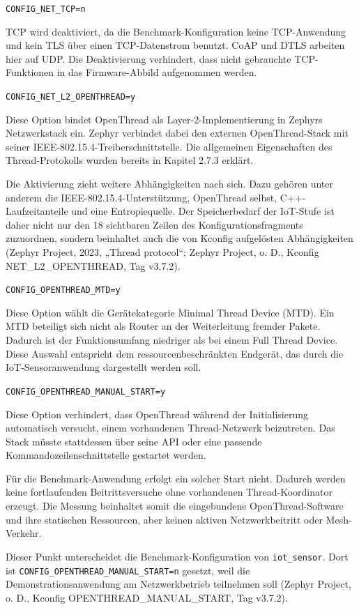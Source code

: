 \lstinline[style=fileinline]|CONFIG_NET_TCP=n|

TCP wird deaktiviert, da die Benchmark-Konfiguration keine TCP-Anwendung und kein TLS über einen TCP-Datenstrom benutzt. CoAP und DTLS arbeiten hier auf UDP. Die Deaktivierung verhindert, dass nicht gebrauchte TCP-Funktionen in das Firmware-Abbild aufgenommen werden.

\lstinline[style=fileinline]|CONFIG_NET_L2_OPENTHREAD=y|

Diese Option bindet OpenThread als Layer-2-Implementierung in Zephyrs Netzwerkstack ein. Zephyr verbindet dabei den externen OpenThread-Stack mit seiner IEEE-802.15.4-Treiberschnittstelle. Die allgemeinen Eigenschaften des Thread-Protokolls wurden bereits in Kapitel 2.7.3 erklärt.

Die Aktivierung zieht weitere Abhängigkeiten nach sich. Dazu gehören unter anderem die IEEE-802.15.4-Unterstützung, OpenThread selbst, C++-Laufzeitanteile und eine Entropiequelle. Der Speicherbedarf der IoT-Stufe ist daher nicht nur den 18 sichtbaren Zeilen des Konfigurationsfragments zuzuordnen, sondern beinhaltet auch die von Kconfig aufgelösten Abhängigkeiten (Zephyr Project, 2023, „Thread protocol“; Zephyr Project, o. D., Kconfig NET\_L2\_OPENTHREAD, Tag v3.7.2).

\lstinline[style=fileinline]|CONFIG_OPENTHREAD_MTD=y|

Diese Option wählt die Gerätekategorie Minimal Thread Device (MTD). Ein MTD beteiligt sich nicht als Router an der Weiterleitung fremder Pakete. Dadurch ist der Funktionsumfang niedriger als bei einem Full Thread Device. Diese Auswahl entspricht dem ressourcenbeschränkten Endgerät, das durch die IoT-Sensoranwendung dargestellt werden soll.

\lstinline[style=fileinline]|CONFIG_OPENTHREAD_MANUAL_START=y|

Diese Option verhindert, dass OpenThread während der Initialisierung automatisch versucht, einem vorhandenen Thread-Netzwerk beizutreten. Das Stack müsste stattdessen über seine API oder eine passende Kommandozeilenschnittstelle gestartet werden.

Für die Benchmark-Anwendung erfolgt ein solcher Start nicht. Dadurch werden keine fortlaufenden Beitrittsversuche ohne vorhandenen Thread-Koordinator erzeugt. Die Messung beinhaltet somit die eingebundene OpenThread-Software und ihre statischen Ressourcen, aber keinen aktiven Netzwerkbeitritt oder Mesh-Verkehr.

Dieser Punkt unterscheidet die Benchmark-Konfiguration von \lstinline[style=fileinline]|iot_sensor|. Dort ist \lstinline[style=fileinline]|CONFIG_OPENTHREAD_MANUAL_START=n| gesetzt, weil die Demonstrationsanwendung am Netzwerkbetrieb teilnehmen soll (Zephyr Project, o. D., Kconfig OPENTHREAD\_MANUAL\_START, Tag v3.7.2).

